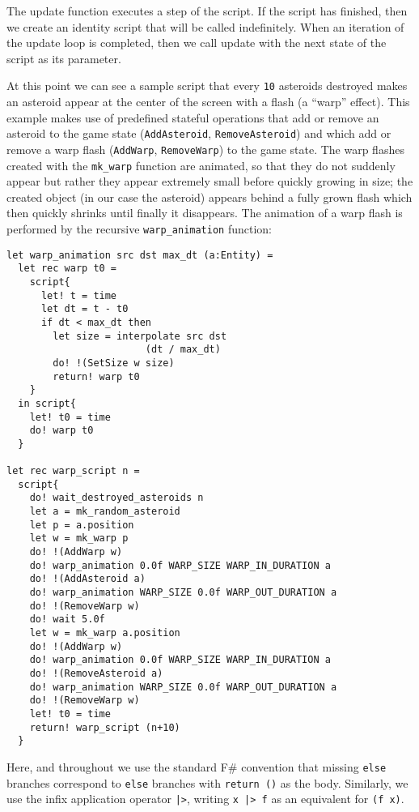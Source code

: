 The update function executes a step of the script. If the script has
finished, then we create an identity script that will be called
indefinitely. When an iteration of the update loop is completed, then
we call update with the next state of the script as its parameter. 

At this point we can see a sample script that every \texttt{10}
asteroids destroyed makes an asteroid appear at the center of the
screen with a flash (a ``warp'' effect). This example makes use of
predefined stateful operations that add or remove an asteroid to the
game state (\texttt{AddAsteroid}, \texttt{RemoveAsteroid}) and which
add or remove a warp flash (\texttt{AddWarp}, \texttt{RemoveWarp}) to
the game state. The warp flashes created with the \texttt{mk\_warp}
function are animated, so that they do not suddenly appear but rather
they appear extremely small before quickly growing in size; the
created object (in our case the asteroid) appears behind a fully grown
flash which then quickly shrinks until finally it disappears. The
animation of a warp flash is performed by the recursive
\texttt{warp\_animation} function:

\begin{lstlisting}
let warp_animation src dst max_dt (a:Entity) =
  let rec warp t0 = 
    script{
      let! t = time
      let dt = t - t0
      if dt < max_dt then
        let size = interpolate src dst 
                        (dt / max_dt)
        do! !(SetSize w size)
        return! warp t0
    }
  in script{
    let! t0 = time
    do! warp t0
  }

let rec warp_script n =
  script{
    do! wait_destroyed_asteroids n
    let a = mk_random_asteroid
    let p = a.position
    let w = mk_warp p
    do! !(AddWarp w)
    do! warp_animation 0.0f WARP_SIZE WARP_IN_DURATION a
    do! !(AddAsteroid a)
    do! warp_animation WARP_SIZE 0.0f WARP_OUT_DURATION a
    do! !(RemoveWarp w)
    do! wait 5.0f
    let w = mk_warp a.position
    do! !(AddWarp w)
    do! warp_animation 0.0f WARP_SIZE WARP_IN_DURATION a
    do! !(RemoveAsteroid a)
    do! warp_animation WARP_SIZE 0.0f WARP_OUT_DURATION a
    do! !(RemoveWarp w)
    let! t0 = time
    return! warp_script (n+10) 
  }
\end{lstlisting}

Here, and throughout we use the standard F\# convention that missing
\texttt{else} branches correspond to \texttt{else} branches with
\texttt{return ()} as the body. Similarly, we use the infix
application operator \texttt{|>}, writing \texttt{x |> f} as an
equivalent for \texttt{(f x)}. 


